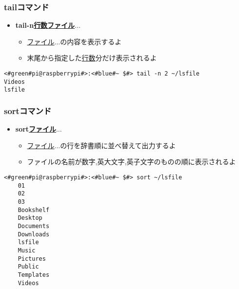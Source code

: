 \begin{frame}[fragile]
    \frametitle{tailコマンド}
    \begin{itemize}
        \item {\bf tail\textvisiblespace -n\textvisiblespace\underline{行数}\textvisiblespace\underline{ファイル}$\ldots$}
        \begin{itemize}
            \small
            \item[] \underline{ファイル}$\ldots$の内容を表示するよ
            \item[] 末尾から指定した\underline{行数}分だけ表示されるよ
        \end{itemize}
    \end{itemize}
    \begin{lstlisting}[title=tailコマンドの実行例, label=tail_example]
<#green#pi@raspberrypi#>:<#blue#~ $#> tail -n 2 ~/lsfile
Videos
lsfile
    \end{lstlisting}
\end{frame}

\begin{frame}[fragile]
    \frametitle{sortコマンド}
    \begin{itemize}
        \item {\bf sort\textvisiblespace\underline{ファイル}$\ldots$}
        \begin{itemize}
            \small
            \item[] \underline{ファイル}$\ldots$の行を辞書順に並べ替えて出力するよ
            \item[] ファイルの名前が数字,英大文字,英子文字のものの順に表示されるよ
    \end{itemize}
\end{itemize}
\begin{lstlisting}[title=sortコマンドの実行例, label=sort_example]
    <#green#pi@raspberrypi#>:<#blue#~ $#> sort ~/lsfile
    01
    02
    03
    Bookshelf
    Desktop
    Documents
    Downloads
    lsfile
    Music
    Pictures
    Public
    Templates
    Videos
    \end{lstlisting}
\end{frame}

